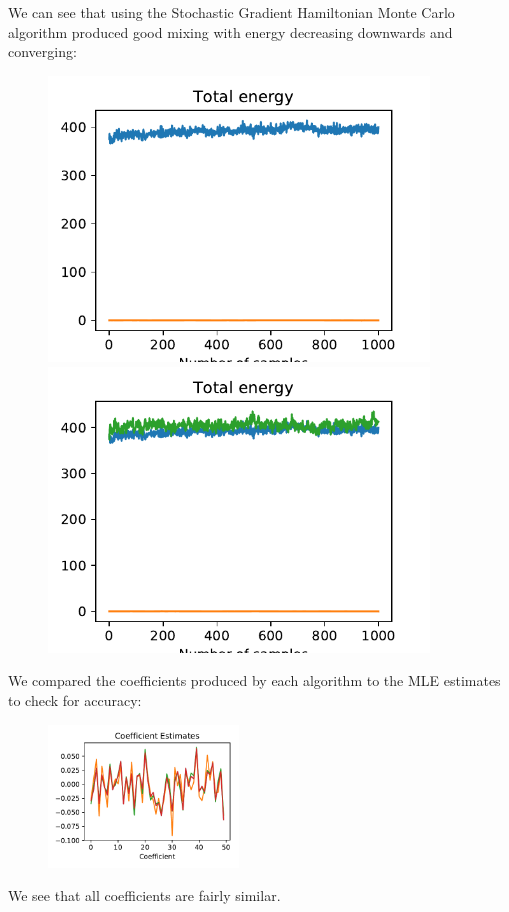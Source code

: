We can see that using the Stochastic Gradient Hamiltonian Monte Carlo algorithm produced good mixing with energy decreasing downwards and converging:

\begin{figure}[H]
	\centering
	\begin{minipage}{0.45\textwidth}
		\centering
		\includegraphics[width=0.9\textwidth]{sghmc-trace-sim.pdf} %
	\end{minipage}\hfill
	\begin{minipage}{0.45\textwidth}
		\centering
		\includegraphics[width=0.9\textwidth]{sghmc-energy-sim.pdf} %
	\end{minipage}
\end{figure}

We compared the coefficients produced by each algorithm to the MLE estimates to check for accuracy:

\begin{figure}[H]
	\centering
	\includegraphics[width=0.45\textwidth]{coefs-sim.pdf}
\end{figure}

We see that all coefficients are fairly similar.